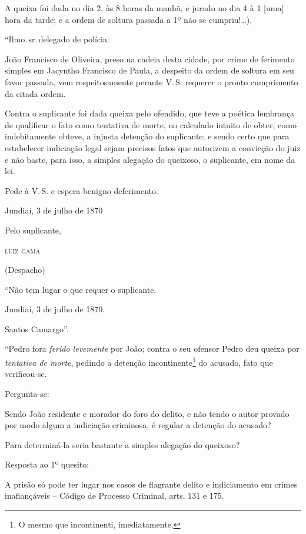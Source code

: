A queixa foi dada no dia 2, às 8 horas da manhã, e jurado no dia 4 à 1
{[}uma{]} hora da tarde; e a ordem de soltura passada a 1º não se
cumpriu!\ldots{}).

\asterisc{}

``Ilmo.\,sr.\,delegado de polícia.

João Francisco de Oliveira, preso na cadeia desta cidade, por crime de
ferimento simples em Jacyntho Francisco de Paula, a despeito da ordem de
soltura em seu favor passada, vem respeitosamente perante V.\,S. requerer
o pronto cumprimento da citada ordem.

Contra o suplicante foi dada queixa pelo ofendido, que teve a poética
lembrança de qualificar o fato como tentativa de morte, no calculado
intuito de obter, como indebitamente obteve, a injusta detenção do
suplicante; e sendo certo que para estabelecer indiciação legal sejam
precisos fatos que autorizem a convicção do juiz e não baste, para isso,
a simples alegação do queixoso, o suplicante, em nome da lei.

Pede à V.\,S. e espera benigno deferimento.

\begin{flushright}
Jundiaí, 3 de julho de 1870

Pelo suplicante,

\textsc{luiz gama}
\end{flushright}

(Despacho)

``Não tem lugar o que requer o suplicante.

Jundiaí, 3 de julho de 1870.

Santos Camargo''.

\asterisc{}

``Pedro fora \emph{ferido levemente} por João; contra o seu ofensor Pedro
deu queixa por \emph{tentativa de morte}, pedindo a detenção
incontinente\footnote{ O mesmo que incontinenti, imediatamente.} do
acusado, fato que verificou-se.

Pergunta-se:

Sendo João residente e morador do foro do delito, e não tendo o autor
provado por modo algum a indiciação criminosa, é regular a detenção do
acusado?

Para determiná-la seria bastante a simples alegação do queixoso?

Resposta ao 1º quesito:

A prisão só pode ter lugar nos casos de flagrante delito e indiciamento
em crimes inafiançáveis -- Código de Processo Criminal, arts. 131 e 175.

